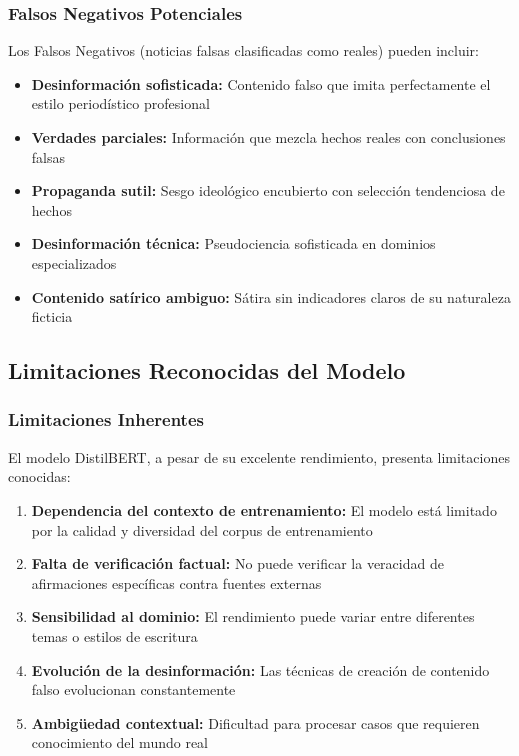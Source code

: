 \subsubsection{Falsos Negativos Potenciales}

Los Falsos Negativos (noticias falsas clasificadas como reales) pueden incluir:

\begin{itemize}
    \item \textbf{Desinformación sofisticada:} Contenido falso que imita perfectamente el estilo periodístico profesional
    \item \textbf{Verdades parciales:} Información que mezcla hechos reales con conclusiones falsas
    \item \textbf{Propaganda sutil:} Sesgo ideológico encubierto con selección tendenciosa de hechos
    \item \textbf{Desinformación técnica:} Pseudociencia sofisticada en dominios especializados
    \item \textbf{Contenido satírico ambiguo:} Sátira sin indicadores claros de su naturaleza ficticia
\end{itemize}

\subsection{Limitaciones Reconocidas del Modelo}

\subsubsection{Limitaciones Inherentes}

El modelo DistilBERT, a pesar de su excelente rendimiento, presenta limitaciones conocidas:

\begin{enumerate}
    \item \textbf{Dependencia del contexto de entrenamiento:} El modelo está limitado por la calidad y diversidad del corpus de entrenamiento
    \item \textbf{Falta de verificación factual:} No puede verificar la veracidad de afirmaciones específicas contra fuentes externas
    \item \textbf{Sensibilidad al dominio:} El rendimiento puede variar entre diferentes temas o estilos de escritura
    \item \textbf{Evolución de la desinformación:} Las técnicas de creación de contenido falso evolucionan constantemente
    \item \textbf{Ambigüedad contextual:} Dificultad para procesar casos que requieren conocimiento del mundo real
\end{enumerate}

